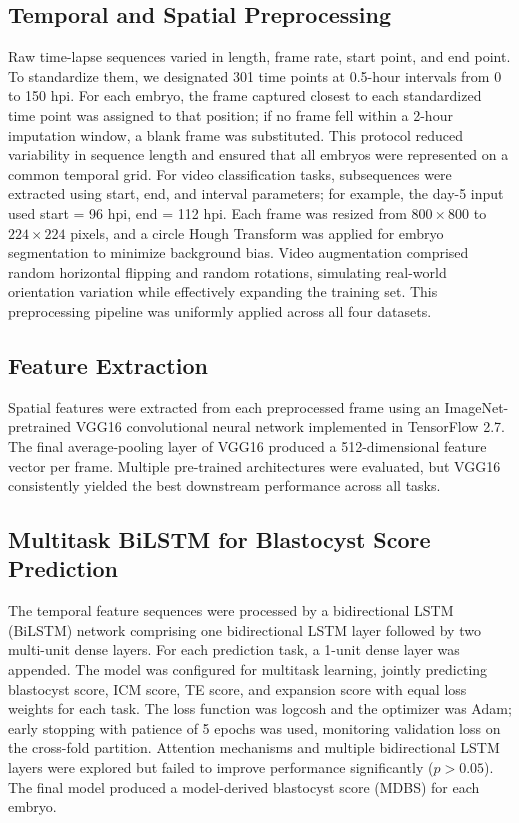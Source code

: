 \documentclass[11pt]{article}
\begin{document}
\subsection{Temporal and Spatial Preprocessing}

Raw time-lapse sequences varied in length, frame rate, start point, and end point. To standardize them, we designated 301 time points at 0.5-hour intervals from 0 to 150 hpi. For each embryo, the frame captured closest to each standardized time point was assigned to that position; if no frame fell within a 2-hour imputation window, a blank frame was substituted. This protocol reduced variability in sequence length and ensured that all embryos were represented on a common temporal grid. For video classification tasks, subsequences were extracted using start, end, and interval parameters; for example, the day-5 input used start = 96 hpi, end = 112 hpi. Each frame was resized from $800 \times 800$ to $224 \times 224$ pixels, and a circle Hough Transform was applied for embryo segmentation to minimize background bias. Video augmentation comprised random horizontal flipping and random rotations, simulating real-world orientation variation while effectively expanding the training set. This preprocessing pipeline was uniformly applied across all four datasets.

\subsection{Feature Extraction}

Spatial features were extracted from each preprocessed frame using an ImageNet-pretrained VGG16 convolutional neural network implemented in TensorFlow 2.7. The final average-pooling layer of VGG16 produced a 512-dimensional feature vector per frame. Multiple pre-trained architectures were evaluated, but VGG16 consistently yielded the best downstream performance across all tasks.

\subsection{Multitask BiLSTM for Blastocyst Score Prediction}

The temporal feature sequences were processed by a bidirectional LSTM (BiLSTM) network comprising one bidirectional LSTM layer followed by two multi-unit dense layers. For each prediction task, a 1-unit dense layer was appended. The model was configured for multitask learning, jointly predicting blastocyst score, ICM score, TE score, and expansion score with equal loss weights for each task. The loss function was logcosh and the optimizer was Adam; early stopping with patience of 5 epochs was used, monitoring validation loss on the cross-fold partition. Attention mechanisms and multiple bidirectional LSTM layers were explored but failed to improve performance significantly ($p > 0.05$). The final model produced a model-derived blastocyst score (MDBS) for each embryo.
\end{document}
